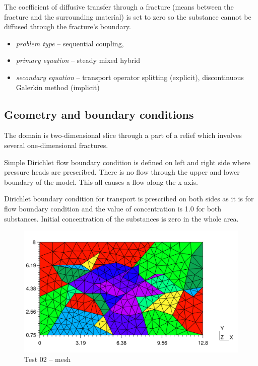 The coefficient of diffusive transfer through a fracture (means between the fracture and the surrounding material) is set to zero so the substance cannot be diffused through the fracture's boundary.

  \begin{itemize} 
    \item \emph{problem type} -- sequential coupling, 
    \item \emph{primary equation} -- steady mixed hybrid
    \item \emph{secondary equation} -- transport operator splitting (explicit), discontinuous Galerkin method (implicit)
  \end{itemize}

\subsection*{Geometry and boundary conditions}
The domain is two-dimensional slice through a part of a relief which involves several one-dimensional fractures.

Simple Dirichlet flow boundary condition is defined on left and right side where pressure heads are prescribed. There is no flow through the upper and lower boundary of the model. This all causes a flow along the x axis.

Dirichlet boundary condition for transport is prescribed on both sides as it is for flow boundary condition and the value of concentration is 1.0 for both substances. Initial concentration of the substances is zero in the whole area. 
%
\begin{figure}[htb!]
\centering
\includegraphics[width=15cm]{tests_graphics/02_mesh.pdf}
\caption{Test 02 -- mesh}
\label{fig:test13_mesh}
\end{figure}
%
%
